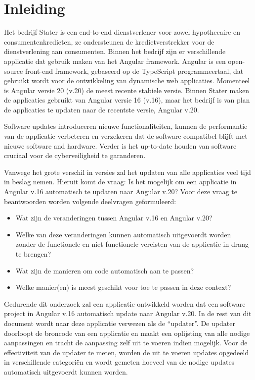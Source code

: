 
\section{Inleiding}
\label{sec:inleiding}

Het bedrijf Stater is een end-to-end dienstverlener voor zowel hypothecaire en consumentenkredieten, ze ondersteunen de kredietverstrekker voor de dienstverlening aan consumenten.
Binnen het bedrijf zijn er verschillende applicatie dat gebruik maken van het Angular framework.
Angular is een open-source front-end framework, gebaseerd op de TypeScript programmeertaal, dat gebruikt wordt voor de ontwikkeling van dynamische web applicaties.
Momenteel is Angular versie 20 (v.20) de meest recente stabiele versie.
Binnen Stater maken de applicaties gebruikt van Angular versie 16 (v.16), maar het bedrijf is van plan de applicaties te updaten naar de recentste versie, Angular v.20.

Software updates introduceren nieuwe functionaliteiten, kunnen de performantie van de applicatie verbeteren en verzekeren dat de software compatibel blijft met nieuwe software and hardware.
Verder is het up-to-date houden van software cruciaal voor de cyberveiligheid te garanderen.

Vanwege het grote verschil in versies zal het updaten van alle applicaties veel tijd in beslag nemen.
Hieruit komt de vraag: Is het mogelijk om een applicatie in Angular v.16 automatisch te updaten naar Angular v.20?
Voor deze vraag te beantwoorden worden volgende deelvragen geformuleerd:
\begin{itemize}
  \item Wat zijn de veranderingen tussen Angular v.16 en Angular v.20?
  \item Welke van deze veranderingen kunnen automatisch uitgevoerdt worden zonder de functionele en niet-functionele vereisten van de applicatie in drang te brengen?
  \item Wat zijn de manieren om code automatisch aan te passen?
  \item Welke manier(en) is meest geschikt voor toe te passen in deze context?
\end{itemize}

Gedurende dit onderzoek zal een applicatie ontwikkeld worden dat een software project in Angular v.16 automatisch update naar Angular v.20.
In de rest van dit document wordt naar deze applicatie verwezen als de ``updater''.
De updater doorloopt de broncode van een applicatie en maakt een oplijsting van alle nodige aanpassingen en tracht de aanpassing zelf uit te voeren indien mogelijk.
Voor de effectiviteit van de updater te meten, worden de uit te voeren updates opgedeeld in verschillende categoriën en wordt gemeten hoeveel van de nodige updates automatisch uitgevoerdt kunnen worden.

